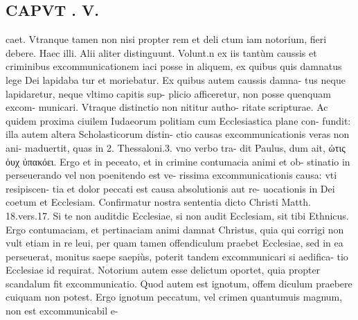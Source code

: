 \documentclass{article}
\begin{document}
\begin{pages}
\section*{CAPVT . V. }\pstart caet. Vtranque tamen non nisi propter rem et deli ctum iam notorium, fieri debere. Haec illi. Alii aliter distinguunt. Volunt.n ex iis tantùm caussis et criminibus excommunicationem iaci posse in aliquem, ex quibus quis damnatus lege Dei lapidaba tur et moriebatur. Ex quibus autem caussis damna- tus neque lapidaretur, neque vltimo capitis sup- plicio afficeretur, non posse quenquam excom- municari. Vtraque distinctio non nititur autho- ritate scripturae. Ac quidem proxima ciuilem Iudaeorum politiam cum Ecclesiastica plane con- fundit: illa autem altera Scholasticorum distin- ctio causas excommunicationis veras non ani- maduertit, quas in 2. Thessaloni.3. vno verbo tra- dit Paulus, dum ait, ὠτις ὀυχ ὐπακόει. Ergo et in peceato, et in crimine contumacia animi et ob- stinatio in perseuerando vel non poenitendo est ve- rissima excommunicationis causa: vti resipiscen- tia et dolor peccati est causa absolutionis aut re- uocationis in Dei coetum et Ecclesiam. Confirmatur nostra sententia dicto Christi Matth. 18.vers.17. Si te non auditdic Ecclesiae, si non audit Ecclesiam, sit tibi Ethnicus. Ergo contumaciam, et pertinaciam animi damnat Christus, quia qui corrigi non vult etiam in re leui, per quam tamen offendiculum praebet Ecclesiae, sed in ea perseuerat, monitus saepe saepiùs, poterit tandem excommunicari si aedifica- tio Ecclesiae id requirat.  \pend\pstart Notorium autem esse delictum oportet, quia propter scandalum fit excommunicatio. Quod autem est ignotum, offem diculum praebere cuiquam non potest. Ergo ignotum peccatum, vel crimen quantumuis magnum, non est excommunicabil e-  \pend

\end{pages}
\end{document}
